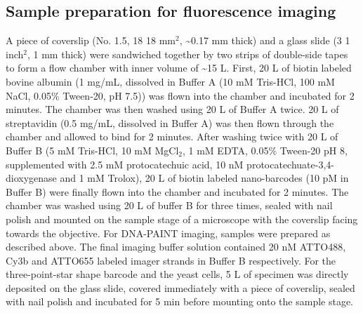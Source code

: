 \subsection{Sample preparation for fluorescence imaging}
A piece of coverslip (No. 1.5, 18  18 mm$^2$, \textasciitilde0.17 mm thick) and a glass slide (3  1 inch$^2$, 1 mm thick) were sandwiched together by two strips of double-side tapes to form a flow chamber with inner volume of \textasciitilde15 \textmu L. First, 20 \textmu L of biotin labeled bovine albumin (1 mg/mL, dissolved in Buffer A (10 mM Tris-HCl, 100 mM NaCl, 0.05\% Tween-20, pH 7.5)) was flown into the chamber and incubated for 2 minutes. The chamber was then washed using 20 \textmu L of Buffer A twice. 20 \textmu L of streptavidin (0.5 mg/mL, dissolved in Buffer A) was then flown through the chamber and allowed to bind for 2 minutes. After washing twice with 20 \textmu L of Buffer B (5 mM Tris-HCl, 10 mM MgCl$_2$, 1 mM EDTA, 0.05\% Tween-20 pH 8, supplemented with 2.5 mM protocatechuic acid, 10 nM protocatechuate-3,4-dioxygenase and 1 mM Trolox), 20 \textmu L of biotin labeled nano-barcodes (10 pM in Buffer B) were finally flown into the chamber and incubated for 2 minutes. The chamber was washed using 20 \textmu L of buffer B for three times, sealed with nail polish and mounted on the sample stage of a microscope with the coverslip facing towards the objective. For DNA-PAINT imaging, samples were prepared as described above. The final imaging buffer solution contained 20 nM ATTO488, Cy3b and ATTO655 labeled imager strands in Buffer B respectively. For the three-point-star shape barcode and the yeast cells, 5 \textmu L of specimen was directly deposited on the glass slide, covered immediately with a piece of coverslip, sealed with nail polish and incubated for 5 min before mounting onto the sample stage. 

